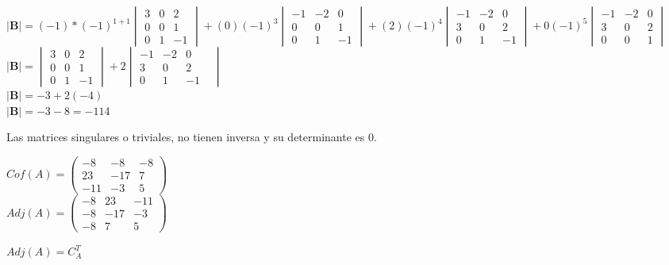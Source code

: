\documentclass[stu, 12pt, a4paper, donotrepeattitle, floatsintext, natbib]{apa7}
\begin{document}
\begin{itemize}
        $\textbf{|B|}=(-1)*(-1)^{1+1} \begin{vmatrix}
                                          3 & 0 & 2 \\ 0 & 0 & 1 \\ 0 & 1 & -1
        \end{vmatrix}
        +
        (0)(-1)^3 \begin{vmatrix}
                      -1 & -2 & 0 \\ 0 & 0 & 1 \\ 0 & 1 & -1
        \end{vmatrix}
        +
        (2)(-1)^4 \begin{vmatrix}
                      -1 & -2 & 0 \\ 3 & 0 & 2 \\ 0 & 1 & -1
        \end{vmatrix}
        +
        0(-1)^5 \begin{vmatrix}
                    -1 & -2 & 0 \\ 3 & 0 & 2 \\ 0 & 0 & 1
        \end{vmatrix}
        $\\[0.5cm]

        $\textbf{|B|}= \begin{vmatrix}
                           3 & 0 & 2 \\ 0 & 0 & 1 \\ 0 & 1 & -1
        \end{vmatrix}
        +
        2 \begin{vmatrix}
              -1 & -2 & 0 & \\ 3 & 0 & 2 \\ 0 & 1 & -1
        \end{vmatrix}
        $\\[0.5cm]
        $\textbf{|B|} = -3 + 2(-4)$\\[0.5cm]
        $\textbf{|B|} = -3-8 = -11 $4
    \end{itemize}

    Las matrices singulares o triviales, no tienen inversa y su determinante es 0.\\[0.5cm]
    \begin{paracol}{2}
        $
            {Cof}(A)= \begin{pmatrix}
                          -8 & -8 & -8 \\ 23 & -17 & 7 \\ -11 & -3 & 5
        \end{pmatrix}$\\
        \vspace{0.5cm}
        $
            {Adj}(A)=\begin{pmatrix}
                         -8 & 23 & -11 \\ -8 & -17 & -3 \\ -8 & 7 & 5
        \end{pmatrix}
        $

        \switchcolumn
        ${Adj}(A)=C_A^T$
    \end{paracol}
\end{document}
